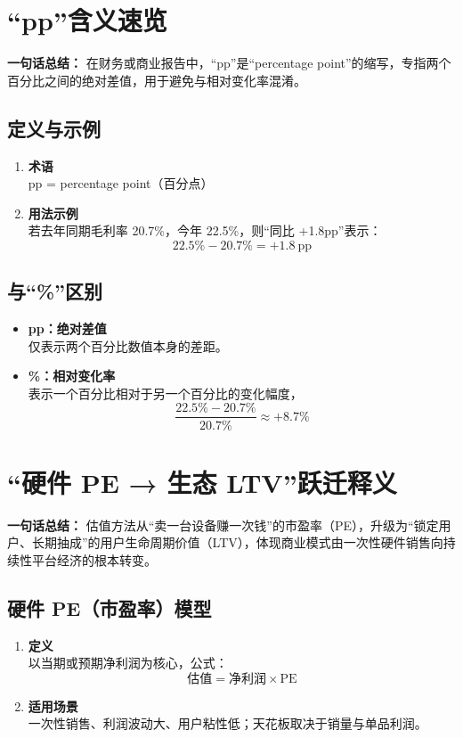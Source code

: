 {\color{red}\section{“pp”含义速览}}
\textbf{一句话总结：}  
在财务或商业报告中，“pp”是“percentage point”的缩写，专指两个百分比之间的绝对差值，用于避免与相对变化率混淆。

\subsection{定义与示例}
\begin{enumerate}[leftmargin=*, nosep]
    \item \textbf{术语} \\
    {\color{red}pp = percentage point（百分点）}
    \item \textbf{用法示例} \\
    若去年同期毛利率 20.7\%，今年 22.5\%，则“同比 +1.8pp”表示：\\
    \[
    22.5\% - 20.7\% = +1.8\ \text{pp}
    \]
\end{enumerate}

\subsection{与“\%”区别}
\begin{itemize}[leftmargin=*, nosep]
    \item \textbf{pp：绝对差值} \\
    仅表示两个百分比数值本身的差距。
    \item \textbf{\%：相对变化率} \\
    表示一个百分比相对于另一个百分比的变化幅度，\\
    \[
    \frac{22.5\% - 20.7\%}{20.7\%} \approx +8.7\%
    \]
\end{itemize}


\section{“硬件 PE → 生态 LTV”跃迁释义}
\textbf{一句话总结：}  
估值方法从“卖一台设备赚一次钱”的{\color{red}市盈率（PE）}，升级为“锁定用户、长期抽成”的{\color{red}用户生命周期价值（LTV）}，{\color{red}体现商业模式由一次性硬件销售向持续性平台经济}的根本转变。

\subsection{硬件 PE（市盈率）模型}
\begin{enumerate}[leftmargin=*, nosep]
    \item \textbf{定义}  \\
    以当期或预期净利润为核心，公式：  
    \[
    \text{估值} = \text{净利润} \times \text{PE}
    \]
    \item \textbf{适用场景}  \\
    一次性销售、利润波动大、用户粘性低；天花板取决于销量与单品利润。
\end{enumerate}

